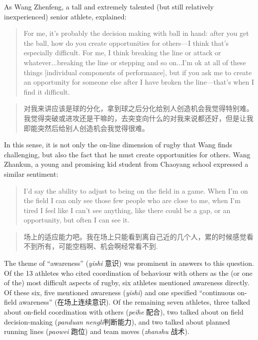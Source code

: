 \begin{CJK}{UTF8}{gbsn}
As Wang Zhenfeng, a tall and extremely talented (but still relatively inexperienced) senior athlete, explained:

\begin{quote}
  For me, it's probably the decision making with ball in hand: after you get the ball, how do you create opportunities for others---I think that's especially difficult.  For me, I think breaking the line or attack or whatever...breaking the line or stepping and so on...I'm ok at all of these things [individual components of performance], but if you ask me to create an opportunity for someone else after I have broken the line---that's when I find it difficult.
\end{quote}

\begin{quote}
  对我来讲应该是球的分化，拿到球之后分化给别人创造机会我觉得特别难。我觉得突破或进攻还是干嘛的，去突变向什么的对我来说都还好，但是让我即能突然后给别人创造机会我觉得很难。
\end{quote}

In this sense, it is not only the on-line dimension of rugby that Wang finds challenging, but also the fact that he must create opportunities for others.  Wang Zhankun, a young and promising kid student from Chaoyang school expressed a similar sentiment:

\begin{quote}
  I’d say the ability to adjust to being on the field in a game.  When I’m on the field I can only see those few people who are close to me, when I’m tired I feel like I can’t see anything, like there could be a gap, or an opportunity, but often I can see it.
\end{quote}

\begin{quote}
  场上的适应能力吧。我在场上只能看到离自己近的几个人，累的时候感觉看不到所有，可能空档啊、机会啊经常看不到.
\end{quote}

The theme of ``awareness'' (\textit{yishi} 意识) was prominent in answers to this question. Of the 13 athletes who cited coordination of behaviour with others as the (or one of the) most difficult aspects of rugby,  six athletes mentioned awareness directly.  Of these six, five mentioned awareness (\textit{yishi}) and one specified ``continuous on-field awareness'' (在场上连续意识).  Of the remaining seven athletes, three talked about on-field coordination with others (\textit{peihe} 配合), two talked about on field decision-making (\textit{panduan nengli}判断能力), and two talked about planned running lines (\textit{paowei} 跑位) and team moves (\textit{zhanshu} 战术).


\end{CJK}
